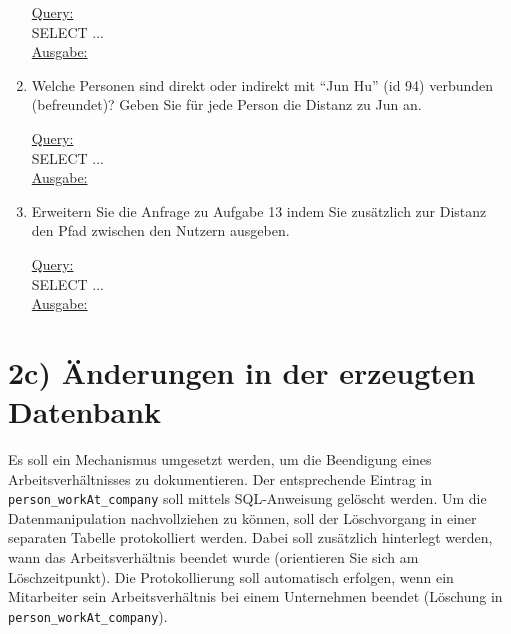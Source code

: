 \begin{enumerate}
    \uline{Query:}\\
    SELECT ...\\
    \uline{Ausgabe:}\\

    \item Welche Personen sind direkt oder indirekt mit \enquote{Jun Hu} (id 94) verbunden (befreundet)? Geben Sie für jede Person die Distanz zu Jun an.

    \uline{Query:}\\
    SELECT ...\\
    \uline{Ausgabe:}\\

    \item Erweitern Sie die Anfrage zu Aufgabe 13 indem Sie zusätzlich zur Distanz den Pfad zwischen den Nutzern ausgeben.

    \uline{Query:}\\
    SELECT ...\\
    \uline{Ausgabe:}\\

\end{enumerate}

\section*{2c) Änderungen in der erzeugten Datenbank}
Es soll ein Mechanismus umgesetzt werden, um die Beendigung eines Arbeitsverhältnisses zu dokumentieren.
Der entsprechende Eintrag in \texttt{person\_workAt\_company} soll mittels SQL-Anweisung gelöscht werden.
Um die Datenmanipulation nachvollziehen zu können, soll der Löschvorgang in einer separaten Tabelle protokolliert werden.
Dabei soll zusätzlich hinterlegt werden, wann das Arbeitsverhältnis beendet wurde (orientieren Sie sich am Löschzeitpunkt).
Die Protokollierung soll automatisch erfolgen, wenn ein Mitarbeiter sein Arbeitsverhältnis bei einem Unternehmen beendet (Löschung in \texttt{person\_workAt\_company}).


